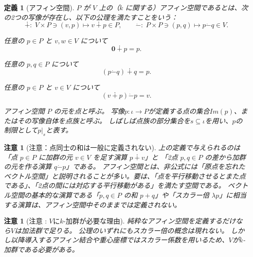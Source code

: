 \documentclass[a4paper,12pt]{bxjsbook}
\theoremstyle{theorem}
\newtheorem{definition}[theorem]{定義}
\newtheorem{remark}[theorem]{注意}
\newcommand{\dotminus}{\mathbin{\dot{-}}}
\begin{document}
    \begin{definition}[アフィン空間]
        $P$ が $V$ 上の（$k$ に関する）\emph{アフィン空間}であるとは、次の2つの写像が存在し、以下の公理を満たすことをいう：
        \[
        \dotplus :\; V\times P \ni (v,p) \mapsto v \dotplus p \in P,
        \qquad
        \dotminus:\; P\times P \ni (p,q) \mapsto p \dotminus q \in V.
        \]
        \begin{theoremitemize}[leftmargin=5em, topsep=2pt, partopsep=0pt, itemsep=0pt, parsep=0pt]
            \item[\hspace*{5em}\textbf{公理1}] 任意の $p\in P$ と $v,w\in V$ について
            \[
            \mathbf{0}\dotplus p = p.
            \]
            \item[\hspace*{5em}\textbf{公理2}] 任意の $p,q\in P$ について
            \[
            (p\dotminus q) \dotplus q= p.
            \]
            \item[\hspace*{5em}\textbf{公理3}] 任意の $p\in P$ と $v\in V$ について
            \[
            (v\dotplus p)\dotminus p = v.
            \]
        \end{theoremitemize}
        アフィン空間 $P$ の元を\emph{点}と呼ぶ。
        写像$p:\iota \to P$が定義する点の集合$Im(p)$、またはその写像自体を\emph{点族}と呼ぶ。
        しばしば点族の部分集合を$s\subseteq \iota$を用い、$p$の制限として$p|_s$と表す。
    \end{definition}

    \begin{remark}[注意：点同士の和は一般に定義されない]
        上の定義で与えられるのは「点 $p\in P$ に加群の元 $v\in V$ を足す演算 $p\dotplus v$」と
        「2点 $p,q\in P$ の差から加群の元を作る演算 $q\dotminus p$」である。
        アフィン空間とは、非公式には「原点を忘れたベクトル空間」と説明されることが多い。要は、「点を平行移動させるとまた点である」、「2点の間には対応する平行移動がある」を満たす空間である。
        ベクトル空間の基本的な演算である「$p,q\in P$ の和 $p+q$」や「スカラー倍 $\lambda p$」に相当する演算は、アフィン空間中そのままでは定義されない。
    \end{remark}

    \begin{remark}[注意 : $V$に$k$-加群が必要な理由]
        純粋なアフィン空間を定義するだけなら$V$は加法群で足りる。
        公理のいずれにもスカラー倍の概念は現れない。
        しかし以降導入するアフィン結合や重心座標ではスカラー係数を用いるため、$V$が$k$-加群である必要がある。
    \end{remark}
\end{document}
